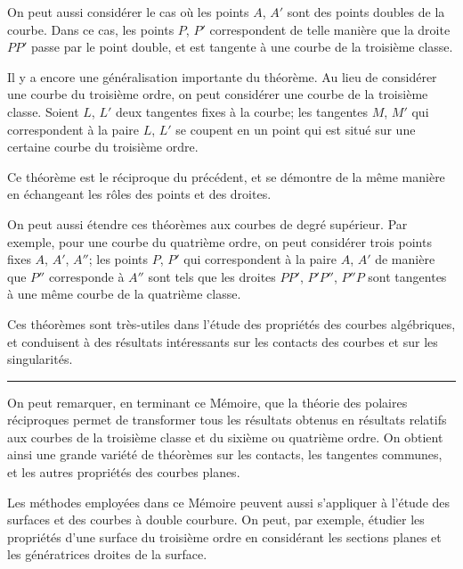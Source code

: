\documentclass[11pt,a4paper]{book}
\begin{document}
On peut aussi consid\'{e}rer le cas o\`{u} les points $A$, $A'$ sont des points doubles de la
courbe. Dans ce cas, les points $P$, $P'$ correspondent de telle mani\`{e}re que la droite $PP'$
passe par le point double, et est tangente \`{a} une courbe de la troisi\`{e}me classe.

\newpage
\setcounter{page}{191}

Il y a encore une g\'{e}n\'{e}ralisation importante du th\'{e}or\`{e}me. Au lieu de consid\'{e}rer une
courbe du troisi\`{e}me ordre, on peut consid\'{e}rer une courbe de la troisi\`{e}me classe. Soient
$L$, $L'$ deux tangentes fixes \`{a} la courbe; les tangentes $M$, $M'$ qui correspondent \`{a} la paire
$L$, $L'$ se coupent en un point qui est situ\'{e} sur une certaine courbe du troisi\`{e}me ordre.

Ce th\'{e}or\`{e}me est le r\'{e}ciproque du pr\'{e}c\'{e}dent, et se d\'{e}montre de la m\^{e}me mani\`{e}re en
\'{e}changeant les r\^{o}les des points et des droites.

\newpage
\setcounter{page}{192}

On peut aussi \'{e}tendre ces th\'{e}or\`{e}mes aux courbes de degr\'{e} sup\'{e}rieur. Par exemple,
pour une courbe du quatri\`{e}me ordre, on peut consid\'{e}rer trois points fixes $A$, $A'$, $A''$;
les points $P$, $P'$ qui correspondent \`{a} la paire $A$, $A'$ de mani\`{e}re que $P''$ corresponde \`{a}
$A''$ sont tels que les droites $PP'$, $P'P''$, $P''P$ sont tangentes \`{a} une m\^{e}me courbe de la
quatri\`{e}me classe.

Ces th\'{e}or\`{e}mes sont tr\`{e}s-utiles dans l'\'{e}tude des propri\'{e}t\'{e}s des courbes alg\'{e}briques, et
conduisent \`{a} des r\'{e}sultats int\'{e}ressants sur les contacts des courbes et sur les singularit\'{e}s.

\newpage
\setcounter{page}{193}

\begin{center}
\rule{0.5\textwidth}{0.4pt}
\end{center}

On peut remarquer, en terminant ce M\'{e}moire, que la th\'{e}orie des polaires r\'{e}ciproques
permet de transformer tous les r\'{e}sultats obtenus en r\'{e}sultats relatifs aux courbes de la
troisi\`{e}me classe et du sixi\`{e}me ou quatri\`{e}me ordre. On obtient ainsi une grande vari\'{e}t\'{e} de
th\'{e}or\`{e}mes sur les contacts, les tangentes communes, et les autres propri\'{e}t\'{e}s des courbes
planes.

Les m\'{e}thodes employ\'{e}es dans ce M\'{e}moire peuvent aussi s'appliquer \`{a} l'\'{e}tude des
surfaces et des courbes \`{a} double courbure. On peut, par exemple, \'{e}tudier les propri\'{e}t\'{e}s
d'une surface du troisi\`{e}me ordre en consid\'{e}rant les sections planes et les g\'{e}n\'{e}ratrices
droites de la surface.
\end{document}
